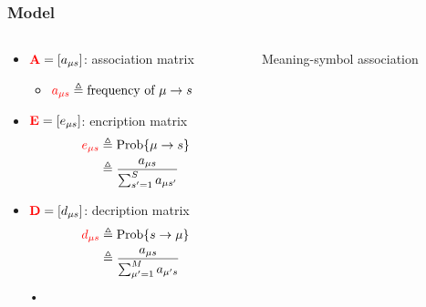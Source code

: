 \documentclass{beamer}
\newcommand{\hbDefined}[1]{\textcolor{red}{{#1}}}
\newcommand{\hbVec}[1]{\mathbf{#1}}
\theoremstyle{plain}
\theoremstyle{definition}
\theoremstyle{remark}
\begin{document}
\begin{frame}\frametitle{Model}
	\begin{columns}[T]
	\begin{column}{.5\linewidth}
		\begin{itemize}

			\item 
			$\hbDefined{\hbVec{A}} = [ a_{\mu s}]$: association matrix
			\begin{itemize}
				\item 
				$
				\hbDefined{a_{\mu s}} 
				\triangleq \text{frequency of }\mu \to s
				$
			\end{itemize}

			\item 
			$\hbDefined{\hbVec{E}} = [ e_{\mu s}]$: encription matrix
			{\small 
				\begin{align*}
					\hbDefined{e_{\mu s}} 
					&\triangleq \text{Prob}\{\mu \to s\}\\ 
					&\triangleq \frac{a_{\mu s}}{\sum_{s'=1}^{S} a_{\mu s'}}
				\end{align*}				
			}

			\item 
			$\hbDefined{\hbVec{D}} = [ d_{\mu s}]$: decription matrix
			{\small 
			\begin{align*}
				\hbDefined{d_{\mu s}} 
				&\triangleq \text{Prob}\{s \to \mu\}\\
				&\triangleq \frac{a_{\mu s}}{\sum_{\mu'=1}^{M} a_{\mu' s}}
			\end{align*}•
			}
		\end{itemize}
		
	\end{column}
	\begin{column}{.5\linewidth}
		Meaning-symbol association\\


\end{column}
\end{columns}
\end{frame}
\end{document}
